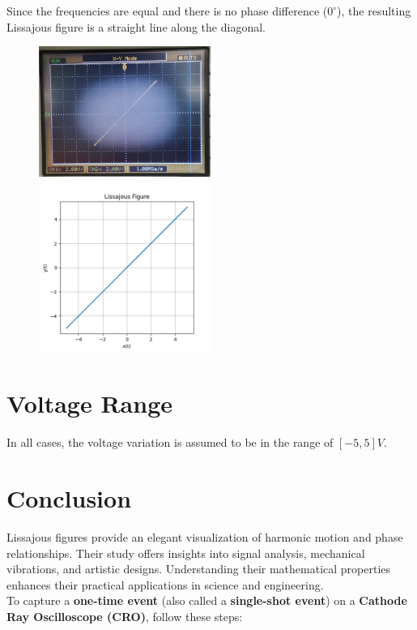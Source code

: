 \documentclass{article}
\begin{document}
Since the frequencies are equal and there is no phase difference (\( 0^\circ \)), the resulting Lissajous figure is a straight line along the diagonal.
\begin{figure}[H]
\centering
\includegraphics[width=0.5\textwidth]{figs/fig6.png}
\includegraphics[width=0.5\textwidth]{figs/fig6_verify.png}
\end{figure}
\section{Voltage Range}
In all cases, the voltage variation is assumed to be in the range of $[-5, 5]V$.

\section{Conclusion}
Lissajous figures provide an elegant visualization of harmonic motion and phase relationships. Their study offers insights into signal analysis, mechanical vibrations, and artistic designs. Understanding their mathematical properties enhances their practical applications in science and engineering.\\
To capture a \textbf{one-time event} (also called a \textbf{single-shot event}) on a \textbf{Cathode Ray Oscilloscope (CRO)}, follow these steps:
\end{document}
